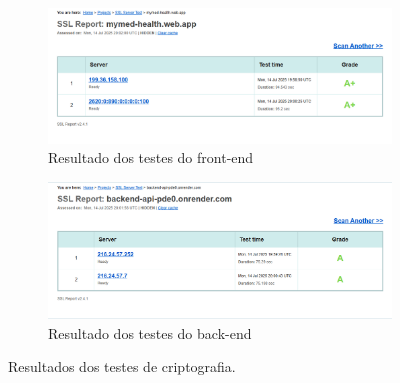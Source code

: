 \documentclass[
	article,			%
	12pt,				%
	oneside,			%
	a4paper,			%
    BIBLATEX,           %
	english,			%
	brazil,				%
	sumario=tradicional
	]{abntex2}
\begin{document}
\begin{figure}[h!]
    \centering
    \begin{subfigure}[b]{0.45\textwidth}
        \centering
        \includegraphics[width=\textwidth]{assets/figuras/certificacao_front.png}
        \caption{Resultado dos testes do front-end}
    \end{subfigure}
    \hfill
    \begin{subfigure}[b]{0.45\textwidth}
        \centering
        \includegraphics[width=\textwidth]{assets/figuras/certificacao_back.png}
        \caption{Resultado dos testes do back-end}
    \end{subfigure}
    \label{fig:testes-criptografia}
    \caption{Resultados dos testes de criptografia.}
\end{figure}





% 
\end{document}
